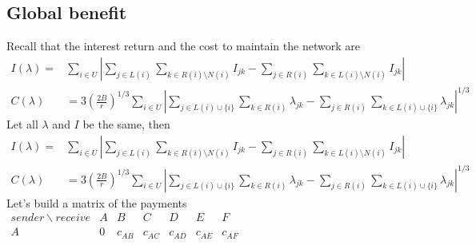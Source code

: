 \documentclass[12pt]{article}
\theoremstyle{plain}
\theoremstyle{remark}
\theoremstyle{definition}
\renewcommand{\leq}{\leqslant}
\renewcommand{\leq}{\leqslant}
\begin{document}
\subsection{Global benefit}
Recall that the interest return and the cost to maintain the network are
\begin{align}
  I(\lambda) = & \sum_{i\in U}|\sum_{j\in L(i)}\sum_{k\in R(i)\setminus N(i)} I_{jk} - \sum_{j\in R(i)}\sum_{k\in L(i)\setminus N(i)} I_{jk}|\\
  C(\lambda) & = 3(\frac{2B}{r})^{1/3} \sum_{i\in U}|\sum_{j\in L(i)\cup \{i\}}\sum_{k\in R(i)} \lambda_{jk} - \sum_{j\in R(i)}\sum_{k\in L(i)\cup \{i\}} \lambda_{jk}|^{1/3}
\end{align}
Let all $\lambda$ and $I$ be the same, then 
\begin{align}
  I(\lambda) = & \sum_{i\in U}|\sum_{j\in L(i)}\sum_{k\in R(i)\setminus N(i)} I_{jk} - \sum_{j\in R(i)}\sum_{k\in L(i)\setminus N(i)} I_{jk}|\\
  C(\lambda) & = 3(\frac{2B}{r})^{1/3} \sum_{i\in U}|\sum_{j\in L(i)\cup \{i\}}\sum_{k\in R(i)} \lambda_{jk} - \sum_{j\in R(i)}\sum_{k\in L(i)\cup \{i\}} \lambda_{jk}|^{1/3}
\end{align}
Let's build a matrix of the payments\\ $
\begin{matrix}
  sender\backslash receive & A & B & C & D & E & F\\
  A & 0 & c_{AB} & c_{AC} & c_{AD} & c_{AE} & c_{AF}
\end{matrix}
$
\end{document}
